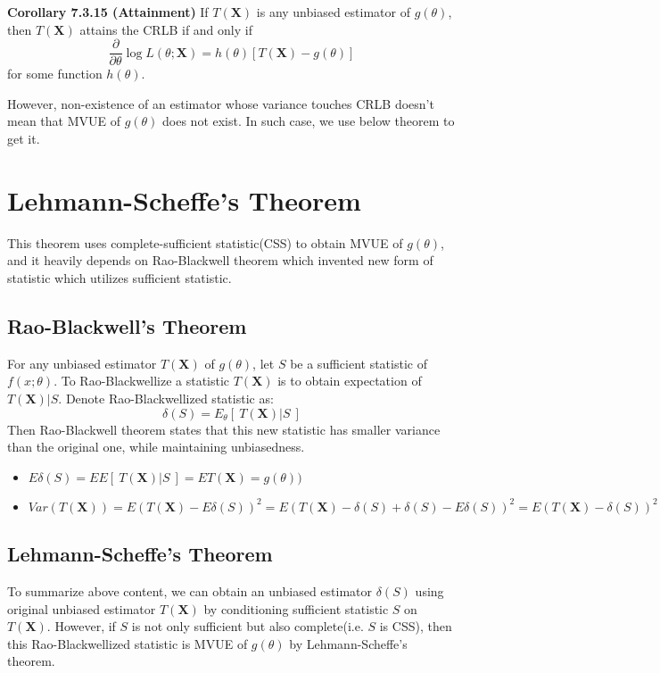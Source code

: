 \documentclass[10pt]{article}
\begin{document}
\textbf{Corollary 7.3.15 (Attainment)} If $T(\textbf{X})$ is any unbiased estimator of $g(\theta)$, then $T(\textbf{X})$ attains the CRLB if and only if
$$
\displaystyle \frac{\partial}{\partial\theta}\log L(\theta;\textbf{X})=h(\theta)[T(\textbf{X})-g(\theta)]
$$
for some function $h(\theta)$.\bigskip

\noindent However, non-existence of an estimator whose variance touches CRLB doesn't mean that MVUE of $g(\theta)$ does not exist. In such case, we use below theorem to get it.

\section{Lehmann-Scheffe's Theorem}
This theorem uses complete-sufficient statistic(CSS) to obtain MVUE of $g(\theta)$, and it heavily depends on Rao-Blackwell theorem which invented new form of statistic which utilizes sufficient statistic.

\subsection{Rao-Blackwell's Theorem}
For any unbiased estimator $T(\textbf{X})$ of $g(\theta)$, let $S$ be a sufficient statistic of $f(x;\theta)$. To Rao-Blackwellize a statistic $T(\textbf{X})$ is to obtain expectation of $T(\textbf{X})|S$. Denote Rao-Blackwellized statistic as: $$\delta(S)=E_{\theta}[\ T(\textbf{X})|S\ ]$$ Then Rao-Blackwell theorem states that this new statistic has smaller variance than the original one, while maintaining unbiasedness.
\begin{itemize}
\item $E\delta(S)=EE[\ T(\textbf{X})|S\ ]=ET(\textbf{X})=g(\theta))$
\item $Var(T(\textbf{X}))=E(T(\textbf{X})-E\delta(S))^2=E(T(\textbf{X})-\delta(S)+\delta(S)-E\delta(S))^2=E(T(\textbf{X})-\delta(S))^2+Var(\delta(S))$
\end{itemize}

\subsection{Lehmann-Scheffe's Theorem}
To summarize above content, we can obtain an unbiased estimator $\delta(S)$ using original unbiased estimator $T(\textbf{X})$ by conditioning sufficient statistic $S$ on $T(\textbf{X})$. However, if $S$ is not only sufficient but also complete(i.e. $S$ is CSS), then this Rao-Blackwellized statistic is MVUE of $g(\theta)$ by Lehmann-Scheffe's theorem.
\end{document}
